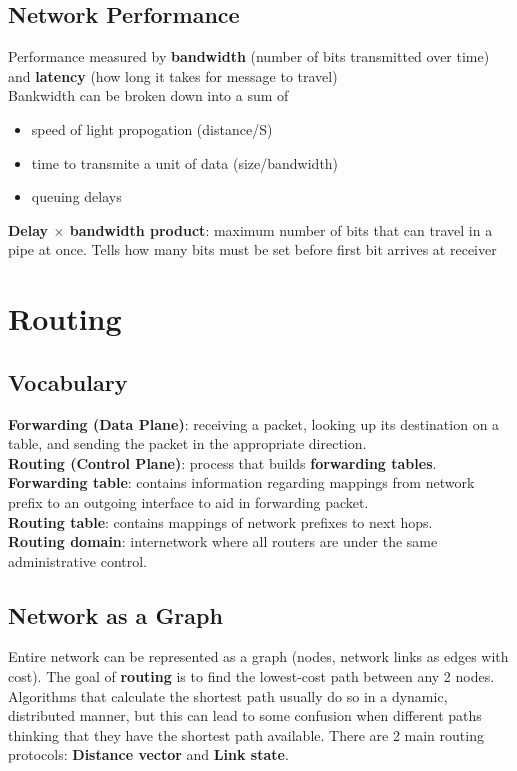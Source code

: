\documentclass{article}
\begin{document}
  \subsection{Network Performance}
    Performance measured by \textbf{bandwidth} (number of bits transmitted over time) and \textbf{latency} (how long it takes for message to travel) \\ 
    Bankwidth can be broken down into a sum of 
    \begin{itemize}
      \item speed of light propogation (distance/S)
      \item time to transmite a unit of data (size/bandwidth)
      \item queuing delays
    \end{itemize}
    \textbf{Delay $\times$ bandwidth product}: maximum number of bits that can travel in a pipe at once. Tells how many bits must be set before first bit arrives at receiver
  \section{Routing}
  \subsection{Vocabulary}
  \textbf{Forwarding (Data Plane)}: receiving a packet, looking up its destination on a table, and sending the packet in the appropriate direction. \\
  \textbf{Routing (Control Plane)}: process that builds \textbf{forwarding tables}. \\
  \textbf{Forwarding table}: contains information regarding mappings from network prefix to an outgoing interface to aid in forwarding packet. \\
  \textbf{Routing table}: contains mappings of network prefixes to next hops. \\
  \textbf{Routing domain}: internetwork where all routers are under the same administrative control.
  \subsection{Network as a Graph}
  Entire network can be represented as a graph (nodes, network links as edges with cost). The goal of \textbf{routing} is to find the lowest-cost path between any 2 nodes. Algorithms that calculate the shortest path usually do so in a dynamic, distributed manner, but this can lead to some confusion when different paths thinking that they have the shortest path available. There are 2 main routing protocols: \textbf{Distance vector} and \textbf{Link state}.
\end{document}
